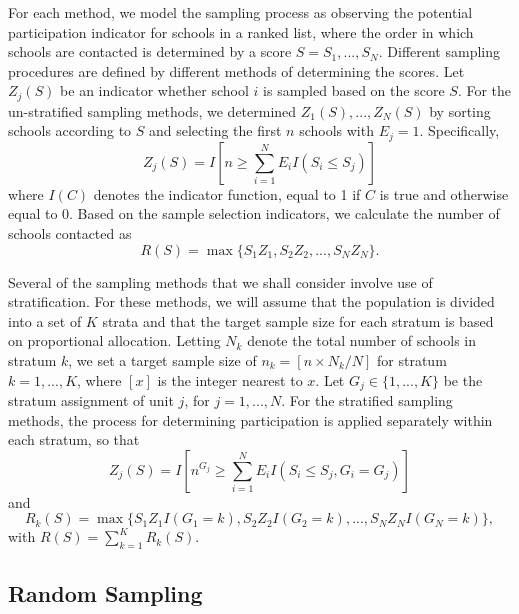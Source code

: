 \documentclass[
  english,
  man,floatsintext]{apa6}
\begin{document}
For each method, we model the sampling process as observing the potential participation indicator for schools in a ranked list, where the order in which schools are contacted is determined by a score \(S = S_1,...,S_N\). Different sampling procedures are defined by different methods of determining the scores. Let \(Z_j(S)\) be an indicator whether school \(i\) is sampled based on the score \(S\).
For the un-stratified sampling methods, we determined \(Z_1(S),...,Z_N(S)\) by sorting schools according to \(S\) and selecting the first \(n\) schools with \(E_j = 1\).
Specifically,
\begin{equation}
\label{eq:Zj}
Z_j(S) = I\left[n \geq \sum_{i=1}^N E_i I\left(S_i \leq S_j\right)\right]
\end{equation}
where \(I(C)\) denotes the indicator function, equal to 1 if \(C\) is true and otherwise equal to 0. Based on the sample selection indicators, we calculate the number of schools contacted as
\begin{equation}
\label{eq:R}
R(S) = \max \{S_1 Z_1, S_2 Z_2, ..., S_N Z_N\}.
\end{equation}

Several of the sampling methods that we shall consider involve use of stratification. For these methods, we will assume that the population is divided into a set of \(K\) strata and that the target sample size for each stratum is based on proportional allocation.
Letting \(N_k\) denote the total number of schools in stratum \(k\), we set a target sample size of \(n_k = [n \times N_k / N]\) for stratum \(k = 1,...,K\), where \([x]\) is the integer nearest to \(x\).
Let \(G_j \in \{1,...,K\}\) be the stratum assignment of unit \(j\), for \(j = 1,...,N\).
For the stratified sampling methods, the process for determining participation is applied separately within each stratum, so that
\begin{equation}
\label{eq:Zj-strat}
Z_j(S) = I\left[n^{G_j} \geq \sum_{i=1}^N E_i I\left(S_i \leq S_j, G_i = G_j\right)\right]
\end{equation}
and
\begin{equation}
\label{eq:R-strat}
R_k(S) = \max \{S_1 Z_1 I(G_1=k) , S_2 Z_2 I(G_2=k), ..., S_N Z_N I(G_N=k)\},
\end{equation}
with \(R(S) = \sum_{k=1}^K R_k(S)\).

\hypertarget{random-sampling}{%
\subsection{Random Sampling}\label{random-sampling}}
\end{document}
